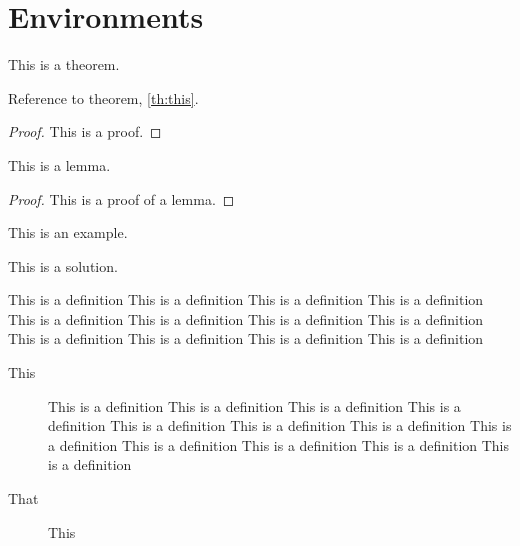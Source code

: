 \section{Environments}

\begin{theorem}\label{th:this}
This is a theorem. 
\end{theorem}

Reference to theorem, \ref{th:this}. 


\begin{proof}
This is a proof. 
\end{proof}



\begin{lemma}
This is a lemma. 
\end{lemma}

\begin{proof}
This is a proof of a lemma. 
\end{proof}



\begin{example}
This is an example. 
\end{example}

\begin{solution}
This is a solution. 
\end{solution}


\begin{definition}[foo]
This is a definition
This is a definition
This is a definition
This is a definition
This is a definition
This is a definition
This is a definition
This is a definition
This is a definition
This is a definition
This is a definition
This is a definition
\end{definition} 


\begin{description}
\item[This] This is a definition
This is a definition
This is a definition
This is a definition
This is a definition
This is a definition
This is a definition
This is a definition
This is a definition
This is a definition
This is a definition
This is a definition
\item[That] This 
\end{description} 